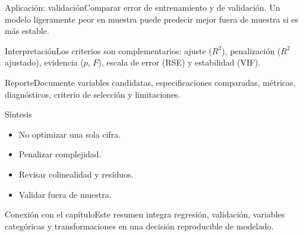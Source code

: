 \documentclass[10pt,aspectratio=169]{beamer}
\begin{document}
\begin{frame}{Aplicación: validación}\small Comparar error de entrenamiento y de validación. Un modelo ligeramente peor en muestra puede predecir mejor fuera de muestra si es más estable.\end{frame}
\begin{frame}{Interpretación}\small Los criterios son complementarios: ajuste ($R^2$), penalización ($R^2$ ajustado), evidencia ($p$, $F$), escala de error (RSE) y estabilidad (VIF).\end{frame}
\begin{frame}{Reporte}\small Documente variables candidatas, especificaciones comparadas, métricas, diagnósticos, criterio de selección y limitaciones.\end{frame}
\begin{frame}{Síntesis}\small\begin{itemize}\item No optimizar una sola cifra.\item Penalizar complejidad.\item Revisar colinealidad y residuos.\item Validar fuera de muestra.\end{itemize}\end{frame}
\begin{frame}{Conexión con el capítulo}\small Este resumen integra regresión, validación, variables categóricas y transformaciones en una decisión reproducible de modelado.\end{frame}
\end{document}
